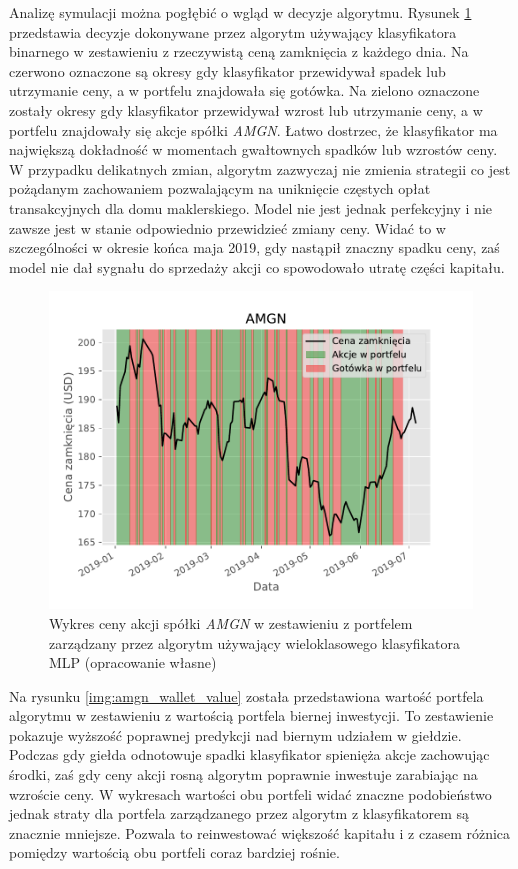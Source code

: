 \documentclass[a4paper, twoside, 11pt, openright]{article}
\begin{document}
\bigskip


Analizę symulacji można pogłębić o wgląd w decyzje algorytmu. Rysunek \ref{img:amgn_wallet_buy_sell} przedstawia decyzje dokonywane przez algorytm używający klasyfikatora binarnego w zestawieniu z rzeczywistą ceną zamknięcia z każdego dnia. Na czerwono oznaczone są okresy gdy klasyfikator przewidywał spadek lub utrzymanie ceny, a w portfelu znajdowała się gotówka. Na zielono oznaczone zostały okresy gdy klasyfikator przewidywał wzrost lub utrzymanie ceny, a w portfelu znajdowały się akcje spółki \textit{AMGN}. Łatwo dostrzec, że klasyfikator ma największą dokładność w momentach gwałtownych spadków lub wzrostów ceny. W przypadku delikatnych zmian, algorytm zazwyczaj nie zmienia strategii co jest pożądanym zachowaniem pozwalającym na uniknięcie częstych opłat transakcyjnych dla domu maklerskiego. Model nie jest jednak perfekcyjny i nie zawsze jest w stanie odpowiednio przewidzieć zmiany ceny. Widać to w szczególności w okresie końca maja 2019, gdy nastąpił znaczny spadku ceny, zaś model nie dał sygnału do sprzedaży akcji co spowodowało utratę części kapitału.

\begin{figure}[H]
\centering \includegraphics[scale=1.1]{img/AMGN-buy_and_sell_plot.pdf}
\caption{Wykres ceny akcji spółki \textit{AMGN} w zestawieniu z portfelem zarządzany przez algorytm używający wieloklasowego klasyfikatora MLP (opracowanie własne)}
\label{img:amgn_wallet_buy_sell}
\end{figure}



Na rysunku \ref{img:amgn_wallet_value} została przedstawiona wartość portfela algorytmu w zestawieniu z wartością portfela biernej inwestycji. To zestawienie pokazuje wyższość poprawnej predykcji nad biernym udziałem w giełdzie. Podczas gdy giełda odnotowuje spadki klasyfikator spienięża akcje zachowując środki, zaś gdy ceny akcji rosną algorytm poprawnie inwestuje zarabiając na wzroście ceny. W wykresach wartości obu portfeli widać znaczne podobieństwo jednak straty dla portfela zarządzanego przez algorytm z klasyfikatorem są znacznie mniejsze. Pozwala to reinwestować większość kapitału i z czasem różnica pomiędzy wartością obu portfeli coraz bardziej rośnie.
\end{document}
